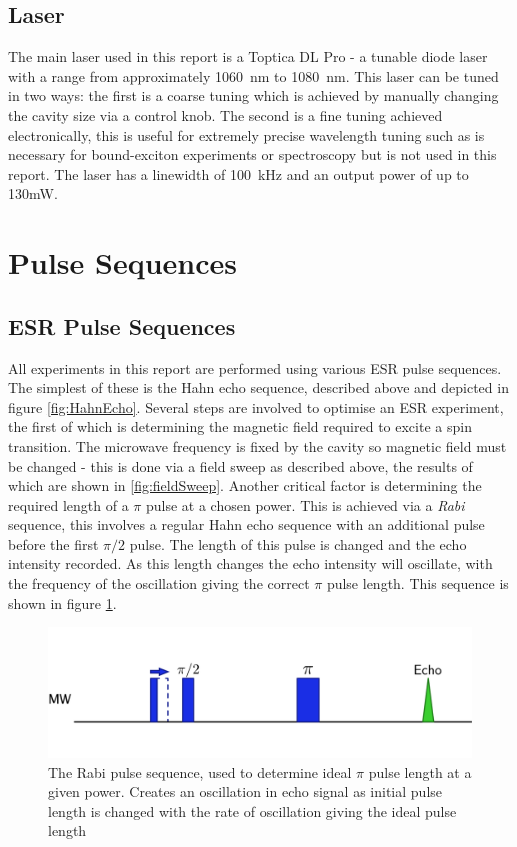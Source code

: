 \subsection{Laser}

The main laser used in this report is a Toptica DL Pro - a tunable diode laser with a range from approximately 1060~nm to 1080~nm.
This laser can be tuned in two ways: the first is a coarse tuning which is achieved by manually changing the cavity size via a control knob.
The second is a fine tuning achieved electronically, this is useful for extremely precise wavelength tuning such as is necessary for bound-exciton experiments or spectroscopy but is not used in this report.
The laser has a linewidth of 100~kHz and an output power of up to 130mW.

\section{Pulse Sequences}


\subsection{ESR Pulse Sequences}

All experiments in this report are performed using various ESR pulse sequences.
The simplest of these is the Hahn echo sequence, described above and depicted in figure \ref{fig:HahnEcho}.
Several steps are involved to optimise an ESR experiment, the first of which is determining the magnetic field required to excite a spin transition.
The microwave frequency is fixed by the cavity so magnetic field must be changed - this is done via a field sweep as described above, the results of which are shown in \ref{fig:fieldSweep}.
Another critical factor is determining the required length of a $\pi$ pulse at a chosen power.
This is achieved via a \emph{Rabi} sequence, this involves a regular Hahn echo sequence with an additional pulse before the first $\pi/2$ pulse.
The length of this pulse is changed and the echo intensity recorded.
As this length changes the echo intensity will oscillate, with the frequency of the oscillation giving the correct $\pi$ pulse length.
This sequence is shown in figure \ref{fig:Rabi}.

\begin{figure}
\centering
\includegraphics[width = \columnwidth]{Figures/Rabi.pdf}
\caption[Rabi Sequence]{The Rabi pulse sequence, used to determine ideal $\pi$ pulse length at a given power. Creates an oscillation in echo signal as initial pulse length is changed with the rate of oscillation giving the ideal pulse length}
\label{fig:Rabi}
\end{figure}

